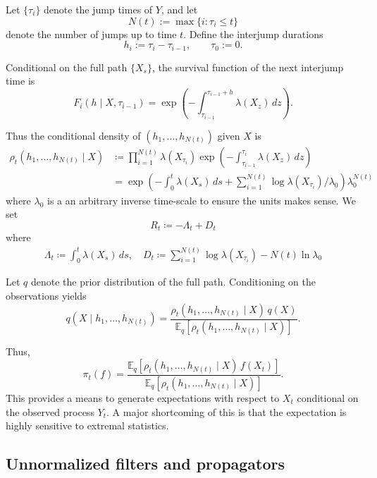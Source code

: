 \documentclass[11pt]{article}
\begin{document}
Let $\{\tau_i\}$ denote the jump times of $Y$, and let
\[
N(t) := \max\{ i : \tau_i \le t\}
\]
denote the number of jumps up to time $t$.  
Define the interjump durations
\[
h_i := \tau_i - \tau_{i-1}, \qquad \tau_0:=0.
\]

Conditional on the full path $\{X_s\}$, the survival function of the next interjump time is
\begin{equation}
F_i(h\mid X,\tau_{i-1})
=
\exp\!\left(
-\int_{\tau_{i-1}}^{\tau_{i-1}+h}\lambda(X_z)\,dz
\right).
\end{equation}

Thus the conditional density of $(h_1,\dots,h_{N(t)})$ given $X$ is
\begin{align}
\rho_t(h_1,\dots,h_{N(t)}\mid X)
&\coloneqq
\prod_{i=1}^{N(t)}
\lambda(X_{\tau_i})
\exp\!\left(
-\int_{\tau_{i-1}}^{\tau_i}\lambda(X_z)\,dz
\right)
\\
&=
\exp\!\left(
-\int_0^{t} \lambda(X_s)\,ds
+
\sum_{i=1}^{N(t)} \log \lambda(X_{\tau_i})/\lambda_0
\right)\lambda_0^{N(t)}
\end{align}
where $\lambda_0$ is a an arbitrary inverse time-scale to ensure the units makes sense. 
We set
\begin{equation}
R_t \coloneqq -\Lambda_t 
+
D_t
\end{equation}
where
\begin{align}
\Lambda_t  \coloneqq \int_0^{t} \lambda(X_s)\,ds,\quad 
D_t \coloneqq \sum_{i=1}^{N(t)} \log \lambda(X_{\tau_i}) - N(t)\ln \lambda_0 
\end{align}

Let $q$ denote the prior distribution of the full path.  
Conditioning on the observations yields
\begin{equation}
q(X\mid h_1,\dots,h_{N(t)})
=
\frac{
\rho_t(h_1,\dots,h_{N(t)}\mid X)\,q(X)
}{
\mathbb E_q\!\left[\rho_t(h_1,\dots,h_{N(t)}\mid X)\right]
}.
\end{equation}

Thus,
\begin{equation}
\pi_t(f)
=
\frac{
\mathbb E_q\!\left[\rho_t(h_1,\dots,h_{N(t)}\mid X)\,f(X_t)\right]
}{
\mathbb E_q\!\left[\rho_t(h_1,\dots,h_{N(t)}\mid X)\right]
}.
\end{equation}
This provides a means to generate expectations with respect to $X_t$ conditional on the observed process $Y_t$. A major shortcoming of this is that the expectation is highly sensitive to extremal statistics. 

\subsection*{Unnormalized filters and propagators}
\end{document}
